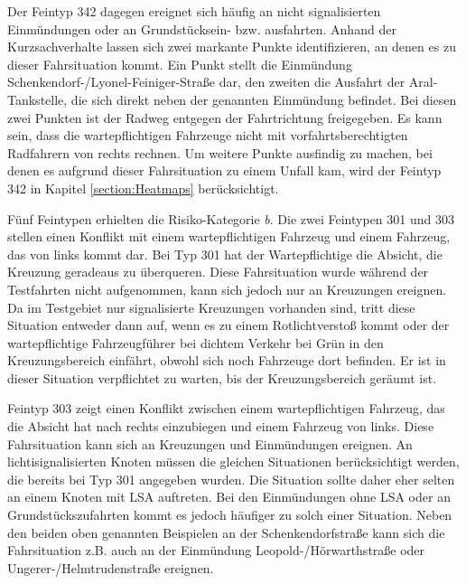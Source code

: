 Der Feintyp 342 dagegen ereignet sich häufig an nicht signalisierten Einmündungen oder an Grundstücksein- bzw. ausfahrten. Anhand der Kurzsachverhalte lassen sich zwei markante Punkte identifizieren, an denen es zu dieser Fahrsituation kommt. Ein Punkt stellt die Einmündung Schenkendorf-/Lyonel-Feiniger-Straße dar, den zweiten die Ausfahrt der Aral-Tankstelle, die sich direkt neben der genannten Einmündung befindet. Bei diesen zwei Punkten ist der Radweg entgegen der Fahrtrichtung freigegeben. Es kann sein, dass die wartepflichtigen Fahrzeuge nicht mit vorfahrtsberechtigten Radfahrern von rechts rechnen. Um weitere Punkte ausfindig zu machen, bei denen es aufgrund dieser Fahrsituation zu einem Unfall kam, wird der Feintyp 342 in Kapitel \ref{section:Heatmaps} berücksichtigt.

Fünf Feintypen erhielten die Risiko-Kategorie \textit{b}. Die zwei Feintypen 301 und 303 stellen einen Konflikt mit einem wartepflichtigen Fahrzeug und einem Fahrzeug, das von links kommt dar. Bei Typ 301 hat der Wartepflichtige die Absicht, die Kreuzung geradeaus zu überqueren. Diese Fahrsituation wurde während der Testfahrten nicht aufgenommen, kann sich jedoch nur an Kreuzungen ereignen. Da im Testgebiet nur signalisierte Kreuzungen vorhanden sind, tritt diese Situation entweder dann auf, wenn es zu einem Rotlichtverstoß kommt oder der wartepflichtige Fahrzeugführer bei dichtem Verkehr bei Grün in den Kreuzungsbereich einfährt, obwohl sich noch Fahrzeuge dort befinden. Er ist in dieser Situation verpflichtet zu warten, bis der Kreuzungsbereich geräumt ist.

Feintyp 303 zeigt einen Konflikt zwischen einem wartepflichtigen Fahrzeug, das die Absicht hat nach rechts einzubiegen und einem Fahrzeug von links. Diese Fahrsituation kann sich an Kreuzungen und Einmündungen ereignen. An lichtisignalisierten Knoten müssen die gleichen Situationen berücksichtigt werden, die bereits bei Typ 301 angegeben wurden. Die Situation sollte daher eher selten an einem Knoten mit \ac{LSA} auftreten. Bei den Einmündungen ohne \ac{LSA} oder an Grundstückszufahrten kommt es jedoch häufiger zu solch einer Situation. Neben den beiden oben genannten Beispielen an der Schenkendorfstraße kann sich die Fahrsituation z.B. auch an der Einmündung Leopold-/Hörwarthstraße oder Ungerer-/Helmtrudenstraße ereignen.

